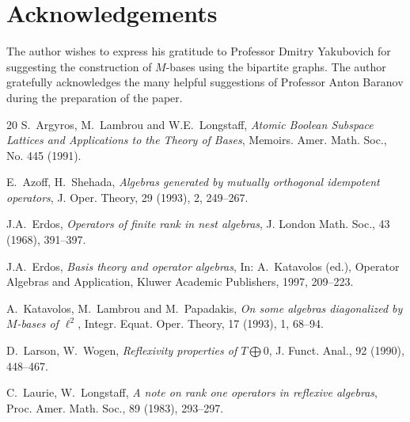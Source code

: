 \documentclass[12pt,oneside,a4paper]{amsart}
\begin{document}
  \section{Acknowledgements}
    The author wishes to express his gratitude to Professor Dmitry Yakubovich for suggesting
      the construction of $M$-bases using the bipartite graphs.
    The author gratefully acknowledges the many helpful suggestions of
      Professor Anton Baranov during the preparation of the paper.
\begin {thebibliography}{20}
    S.~\!Argyros, M.~\!Lambrou and W.E.~\!Longstaff,
    \emph{Atomic Boolean Subspace Lattices and Applications to the Theory of Bases},
    Memoirs. Amer. Math. Soc., No. 445 (1991).

    E.~\!Azoff, H.~\!Shehada,
    \emph{Algebras generated by mutually orthogonal idempotent operators},
    J. Oper. Theory, 29 (1993), 2, 249--267.




    J.A.~\!Erdos,
    \emph{Operators of finite rank in nest algebras},
    J. London Math. Soc., 43 (1968), 391--397.

    J.A.~\!Erdos,
    \emph{Basis theory and operator algebras},
    In: A.~\!Katavolos (ed.), Operator Algebras and Application, Kluwer Academic Publishers, 1997, 209--223.

    A.~\!Katavolos, M.~\!Lambrou and M.~\!Papadakis,
    \emph{On some algebras diagonalized by $M$-bases of $\ell^2$},
    Integr. Equat. Oper. Theory, 17 (1993), 1, 68--94.

    D.~\!Larson, W.~\!Wogen,
    \emph{Reflexivity properties of $T\bigoplus0$},
    J. Funct. Anal., 92 (1990), 448--467.

    C.~\!Laurie, W.~\!Longstaff,
    \emph{A note on rank one operators in reflexive algebras},
    Proc. Amer. Math. Soc., 89 (1983), 293--297.


\end{thebibliography}
\end{document}
